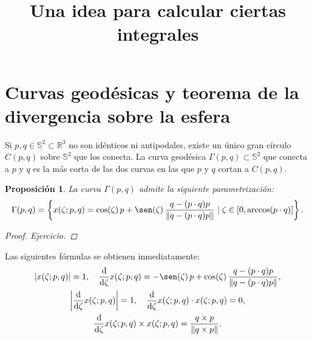 \documentclass[reqno]{amsart}
\newcommand{\norm}[2][y]{\if#1y\left\fi\lVert#2\if#1y\right\fi\rVert} %
\newcommand{\abs}[2][y]{\if#1y\left\fi\lvert#2\if#1y\right\fi\rvert} %
\newtheorem{proposition}[thm]{Proposición}
\begin{document}
\title{Una idea para calcular ciertas integrales}
\maketitle

\section{Curvas geodésicas y teorema de la divergencia sobre la esfera}

Si $p, q \in \mathbb{S}^2 \subset \mathbb{R}^3$ no son idénticos ni antipodales, existe un único gran círculo $C(p,q)$ sobre $\mathbb{S}^2$ que los conecta.
La curva geodésica $\Gamma(p,q) \subset \mathbb{S}^2$ que conecta a $p$ y $q$ es la más corta de las dos curvas en las que $p$ y $q$ cortan a $C(p,q)$.

\begin{proposition}\label{pro:param} La curva $\Gamma(p,q)$ admite la siguiente parametrización:
%
\begin{equation*}
\Gamma(p,q) = \left\{ x(\zeta;p,q) = \cos(\zeta) \, p + \sen(\zeta) \, \frac{q - (p\cdot q)p}{\norm{q - (p\cdot q)p}} \mid \zeta \in [0, \arccos(p\cdot q)] \right\}.
\end{equation*}
%
\begin{proof} Ejercicio.
\end{proof}
\end{proposition}
%
Las siguientes fórmulas se obtienen inmediatamente:
%
\begin{equation}\label{param-aux}
\begin{gathered}
\abs{x(\zeta;p,q)} = 1, \quad
\frac{\mathrm{d}}{\mathrm{d}\zeta} x(\zeta;p,q) = -\sen(\zeta) \, p + \cos(\zeta) \, \frac{q - (p\cdot q)p}{\norm{q - (p\cdot q)p}},\\
\abs{\frac{\mathrm{d}}{\mathrm{d}\zeta} x(\zeta;p,q)} = 1, \quad
\frac{\mathrm{d}}{\mathrm{d}\zeta} x(\zeta;p,q) \cdot x(\zeta;p,q) = 0,\\
\frac{\mathrm{d}}{\mathrm{d}\zeta} x(\zeta;p,q) \times x(\zeta;p,q) = \frac{q \times p}{\norm{q \times p}}.
\end{gathered}
\end{equation}
\end{document}
